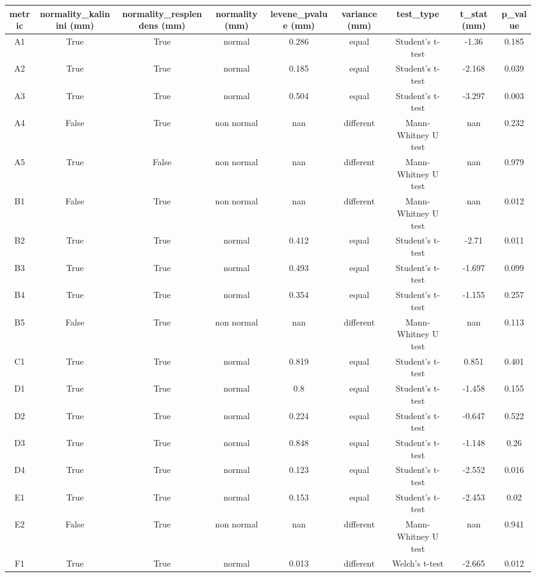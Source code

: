\onecolumngrid\newpage
\small\centering\begin{table}[H]
\centering
\begin{tabular}{|c|c|c|c|c|c|c|c|c|}
\hline
metric & normality\_kalinini (mm) & normality\_resplendens (mm) & normality (mm) & levene\_pvalue (mm) & variance (mm) & test\_type & t\_stat (mm) & p\_value \\ 
\hline
A1 & True & True & normal & 0.286 & equal & Student's t-test & -1.36 & 0.185 \\ 
A2 & True & True & normal & 0.185 & equal & Student's t-test & -2.168 & 0.039 \\ 
A3 & True & True & normal & 0.504 & equal & Student's t-test & -3.297 & 0.003 \\ 
A4 & False & True & non normal & nan & different & Mann-Whitney U test & nan & 0.232 \\ 
A5 & True & False & non normal & nan & different & Mann-Whitney U test & nan & 0.979 \\ 
B1 & False & True & non normal & nan & different & Mann-Whitney U test & nan & 0.012 \\ 
B2 & True & True & normal & 0.412 & equal & Student's t-test & -2.71 & 0.011 \\ 
B3 & True & True & normal & 0.493 & equal & Student's t-test & -1.697 & 0.099 \\ 
B4 & True & True & normal & 0.354 & equal & Student's t-test & -1.155 & 0.257 \\ 
B5 & False & True & non normal & nan & different & Mann-Whitney U test & nan & 0.113 \\ 
C1 & True & True & normal & 0.819 & equal & Student's t-test & 0.851 & 0.401 \\ 
D1 & True & True & normal & 0.8 & equal & Student's t-test & -1.458 & 0.155 \\ 
D2 & True & True & normal & 0.224 & equal & Student's t-test & -0.647 & 0.522 \\ 
D3 & True & True & normal & 0.848 & equal & Student's t-test & -1.148 & 0.26 \\ 
D4 & True & True & normal & 0.123 & equal & Student's t-test & -2.552 & 0.016 \\ 
E1 & True & True & normal & 0.153 & equal & Student's t-test & -2.453 & 0.02 \\ 
E2 & False & True & non normal & nan & different & Mann-Whitney U test & nan & 0.941 \\ 
F1 & True & True & normal & 0.013 & different & Welch's t-test & -2.665 & 0.012 \\ 

\end{tabular}
\end{table}
